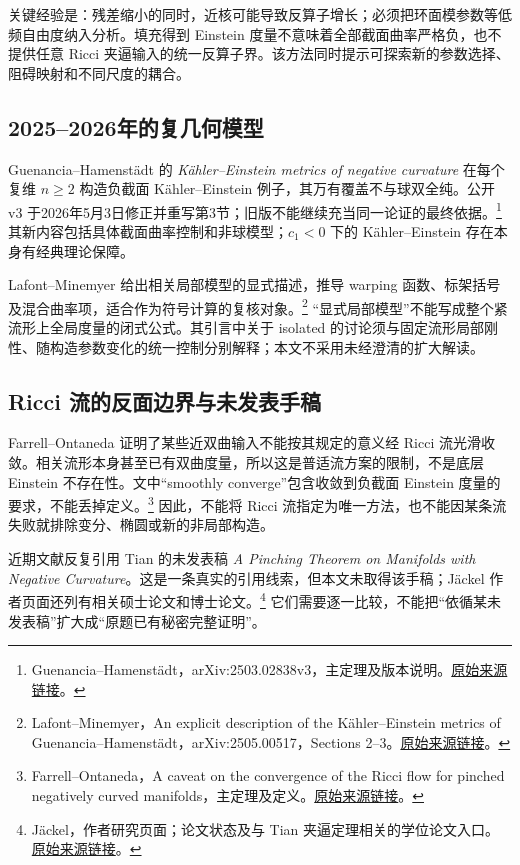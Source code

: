 \documentclass[11pt,a4paper]{article}
\theoremstyle{definition}
\newcommand{\src}[3]{\footnote{\raggedright #1，#2。\href{#3}{原始来源链接}。}}
\begin{document}
关键经验是：残差缩小的同时，近核可能导致反算子增长；必须把环面模参数等低频自由度纳入分析。填充得到 Einstein 度量不意味着全部截面曲率严格负，也不提供任意 Ricci 夹逼输入的统一反算子界。该方法同时提示可探索新的参数选择、阻碍映射和不同尺度的耦合。

\subsection{2025--2026年的复几何模型}

Guenancia--Hamenstädt 的 \emph{Kähler--Einstein metrics of negative curvature} 在每个复维 $n\ge2$ 构造负截面 Kähler--Einstein 例子，其万有覆盖不与球双全纯。公开 v3 于2026年5月3日修正并重写第3节；旧版不能继续充当同一论证的最终依据。\src{Guenancia--Hamenstädt}{arXiv:2503.02838v3，主定理及版本说明}{https://arxiv.org/abs/2503.02838v3}
其新内容包括具体截面曲率控制和非球模型；$c_1<0$ 下的 Kähler--Einstein 存在本身有经典理论保障。

Lafont--Minemyer 给出相关局部模型的显式描述，推导 warping 函数、标架括号及混合曲率项，适合作为符号计算的复核对象。\src{Lafont--Minemyer}{An explicit description of the Kähler--Einstein metrics of Guenancia--Hamenstädt，arXiv:2505.00517，Sections 2--3}{https://arxiv.org/abs/2505.00517}
“显式局部模型”不能写成整个紧流形上全局度量的闭式公式。其引言中关于 isolated 的讨论须与固定流形局部刚性、随构造参数变化的统一控制分别解释；本文不采用未经澄清的扩大解读。

\subsection{Ricci 流的反面边界与未发表手稿}

Farrell--Ontaneda 证明了某些近双曲输入不能按其规定的意义经 Ricci 流光滑收敛。相关流形本身甚至已有双曲度量，所以这是普适流方案的限制，不是底层 Einstein 不存在性。文中“smoothly converge”包含收敛到负截面 Einstein 度量的要求，不能丢掉定义。\src{Farrell--Ontaneda}{A caveat on the convergence of the Ricci flow for pinched negatively curved manifolds，主定理及定义}{https://arxiv.org/abs/math/0311176v2}
因此，不能将 Ricci 流指定为唯一方法，也不能因某条流失败就排除变分、椭圆或新的非局部构造。

近期文献反复引用 Tian 的未发表稿 \emph{A Pinching Theorem on Manifolds with Negative Curvature}。这是一条真实的引用线索，但本文未取得该手稿；Jäckel 作者页面还列有相关硕士论文和博士论文。\src{Jäckel}{作者研究页面；论文状态及与 Tian 夹逼定理相关的学位论文入口}{https://www.friederjaeckel.com/research}
它们需要逐一比较，不能把“依循某未发表稿”扩大成“原题已有秘密完整证明”。
\end{document}
